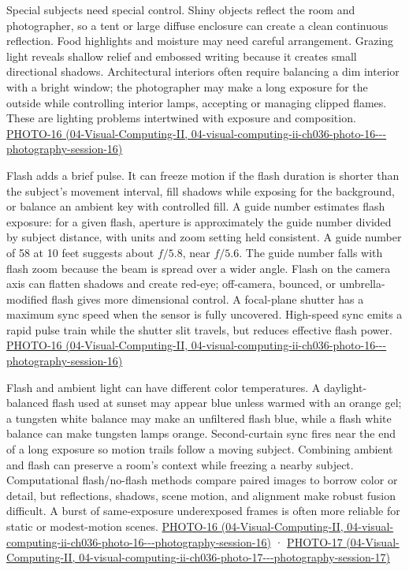 Special subjects need special control. Shiny objects reflect the room and photographer, so a tent or large diffuse enclosure can create a clean continuous reflection. Food highlights and moisture may need careful arrangement. Grazing light reveals shallow relief and embossed writing because it creates small directional shadows. Architectural interiors often require balancing a dim interior with a bright window; the photographer may make a long exposure for the outside while controlling interior lamps, accepting or managing clipped flames. These are lighting problems intertwined with exposure and composition. \href{../04-Visual-Computing-II/main.pdf\#nameddest=04-visual-computing-ii-ch036-photo-16---photography-session-16}{PHOTO-16 (04-Visual-Computing-II, 04-visual-computing-ii-ch036-photo-16-\/-\/-photography-session-16)}

Flash adds a brief pulse. It can freeze motion if the flash duration is shorter than the subject's movement interval, fill shadows while exposing for the background, or balance an ambient key with controlled fill. A guide number estimates flash exposure: for a given flash, aperture is approximately the guide number divided by subject distance, with units and zoom setting held consistent. A guide number of 58 at 10 feet suggests about \(f/5.8\), near \(f/5.6\). The guide number falls with flash zoom because the beam is spread over a wider angle. Flash on the camera axis can flatten shadows and create red-eye; off-camera, bounced, or umbrella-modified flash gives more dimensional control. A focal-plane shutter has a maximum sync speed when the sensor is fully uncovered. High-speed sync emits a rapid pulse train while the shutter slit travels, but reduces effective flash power. \href{../04-Visual-Computing-II/main.pdf\#nameddest=04-visual-computing-ii-ch036-photo-16---photography-session-16}{PHOTO-16 (04-Visual-Computing-II, 04-visual-computing-ii-ch036-photo-16-\/-\/-photography-session-16)}

Flash and ambient light can have different color temperatures. A daylight-balanced flash used at sunset may appear blue unless warmed with an orange gel; a tungsten white balance may make an unfiltered flash blue, while a flash white balance can make tungsten lamps orange. Second-curtain sync fires near the end of a long exposure so motion trails follow a moving subject. Combining ambient and flash can preserve a room's context while freezing a nearby subject. Computational flash/no-flash methods compare paired images to borrow color or detail, but reflections, shadows, scene motion, and alignment make robust fusion difficult. A burst of same-exposure underexposed frames is often more reliable for static or modest-motion scenes. \href{../04-Visual-Computing-II/main.pdf\#nameddest=04-visual-computing-ii-ch036-photo-16---photography-session-16}{PHOTO-16 (04-Visual-Computing-II, 04-visual-computing-ii-ch036-photo-16-\/-\/-photography-session-16)} · \href{../04-Visual-Computing-II/main.pdf\#nameddest=04-visual-computing-ii-ch036-photo-17---photography-session-17}{PHOTO-17 (04-Visual-Computing-II, 04-visual-computing-ii-ch036-photo-17-\/-\/-photography-session-17)}


